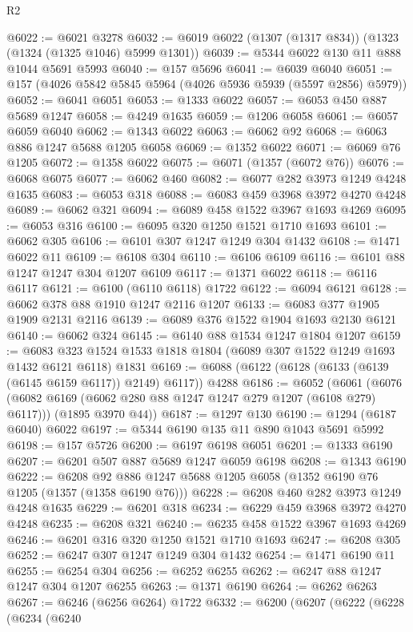 \begin{lexlean}{R2}
\begin{coremodule}
@6022 := @6021 @3278
@6032 := @6019 @6022 (@1307 (@1317 @834)) (@1323 (@1324 (@1325 @1046) @5999 @1301))
@6039 := @5344 @6022 @130 @11 @888 @1044 @5691 @5993
@6040 := @157 @5696
@6041 := @6039 @6040
@6051 := @157 (@4026 @5842 @5845 @5964 (@4026 @5936 @5939 (@5597 @2856) @5979))
@6052 := @6041 @6051
@6053 := @1333 @6022
@6057 := @6053 @450 @887 @5689 @1247
@6058 := @4249 @1635
@6059 := @1206 @6058
@6061 := @6057 @6059 @6040
@6062 := @1343 @6022
@6063 := @6062 @92
@6068 := @6063 @886 @1247 @5688 @1205 @6058
@6069 := @1352 @6022
@6071 := @6069 @76 @1205
@6072 := @1358 @6022
@6075 := @6071 (@1357 (@6072 @76))
@6076 := @6068 @6075
@6077 := @6062 @460
@6082 := @6077 @282 @3973 @1249 @4248 @1635
@6083 := @6053 @318
@6088 := @6083 @459 @3968 @3972 @4270 @4248
@6089 := @6062 @321
@6094 := @6089 @458 @1522 @3967 @1693 @4269
@6095 := @6053 @316
@6100 := @6095 @320 @1250 @1521 @1710 @1693
@6101 := @6062 @305
@6106 := @6101 @307 @1247 @1249 @304 @1432
@6108 := @1471 @6022 @11
@6109 := @6108 @304
@6110 := @6106 @6109
@6116 := @6101 @88 @1247 @1247 @304 @1207 @6109
@6117 := @1371 @6022
@6118 := @6116 @6117
@6121 := @6100 (@6110 @6118) @1722
@6122 := @6094 @6121
@6128 := @6062 @378 @88 @1910 @1247 @2116 @1207
@6133 := @6083 @377 @1905 @1909 @2131 @2116
@6139 := @6089 @376 @1522 @1904 @1693 @2130 @6121
@6140 := @6062 @324
@6145 := @6140 @88 @1534 @1247 @1804 @1207
@6159 := @6083 @323 @1524 @1533 @1818 @1804 (@6089 @307 @1522 @1249 @1693 @1432 @6121 @6118) @1831
@6169 := @6088 (@6122 (@6128 (@6133 (@6139 (@6145 @6159 @6117)) @2149) @6117)) @4288
@6186 := @6052
    (@6061
      (@6076 (@6082 @6169 (@6062 @280 @88 @1247 @1247 @279 @1207 (@6108 @279) @6117)))
      (@1895 @3970 @44))
@6187 := @1297 @130
@6190 := @1294 (@6187 @6040) @6022
@6197 := @5344 @6190 @135 @11 @890 @1043 @5691 @5992
@6198 := @157 @5726
@6200 := @6197 @6198 @6051
@6201 := @1333 @6190
@6207 := @6201 @507 @887 @5689 @1247 @6059 @6198
@6208 := @1343 @6190
@6222 := @6208 @92 @886 @1247 @5688 @1205 @6058 (@1352 @6190 @76 @1205 (@1357 (@1358 @6190 @76)))
@6228 := @6208 @460 @282 @3973 @1249 @4248 @1635
@6229 := @6201 @318
@6234 := @6229 @459 @3968 @3972 @4270 @4248
@6235 := @6208 @321
@6240 := @6235 @458 @1522 @3967 @1693 @4269
@6246 := @6201 @316 @320 @1250 @1521 @1710 @1693
@6247 := @6208 @305
@6252 := @6247 @307 @1247 @1249 @304 @1432
@6254 := @1471 @6190 @11
@6255 := @6254 @304
@6256 := @6252 @6255
@6262 := @6247 @88 @1247 @1247 @304 @1207 @6255
@6263 := @1371 @6190
@6264 := @6262 @6263
@6267 := @6246 (@6256 @6264) @1722
@6332 := @6200
    (@6207
      (@6222
        (@6228
          (@6234
            (@6240

\end{coremodule}
\end{lexlean}
